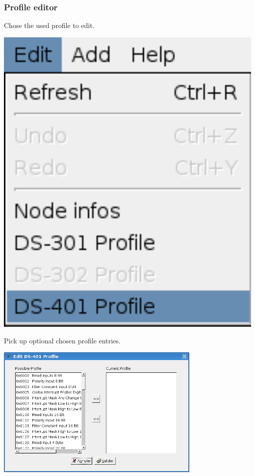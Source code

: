 \documentclass[12pt,twoside]{article}
\begin{document}
\subsubsection{Profile editor}
Chose the used profile to edit.\newline
 \begin{center}
   \includegraphics[width=15cm]{Pictures/10000000000000AB000000C88F594413.png}
\end{center}

Pick up optional chosen profile entries.\newline
 \begin{center}
   \includegraphics[width=10cm]{Pictures/10000201000002DE000001D82D89C224.png}
\end{center}
\end{document}
